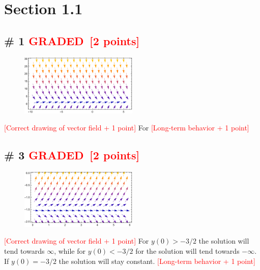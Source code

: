 \documentclass[12pt,letterpaper]{exam}
\newcommand{\grade}{\textcolor{red}{GRADED}}
\newcommand{\pts}[1]{\textcolor{red}{[#1]}}
\begin{document}
\section*{Section 1.1}

\subsection*{\# 1 \grade \, \pts{2 points}}

 \begin{figure}[h!]
\centering
\includegraphics[width=0.5\textwidth]{./1p1_1.pdf}
\end{figure}
\noindent
\pts{Correct drawing of vector field + 1 point}
For 
\pts{Long-term behavior + 1 point}

\subsection*{\# 3 \grade \, \pts{2 points}}

 \begin{figure}[h!]
\centering
\includegraphics[width=0.5\textwidth]{./1p1_3.pdf}
\end{figure}
\noindent \pts{Correct drawing of vector field + 1 point}
For $y(0)>-3/2$ the solution will tend towards $\infty$, while for $y(0)<-3/2$ for the solution will tend towards  $-\infty$. If $y(0) = -3/2$ the solution will stay constant. 
\pts{Long-term behavior + 1 point}
\end{document}
